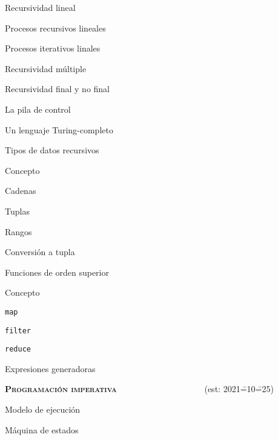 \begin{longenum}
\begin{longenum}
\begin{longenum}
\begin{longenum}
                \item Recursividad lineal
                \begin{longenum}
                    \item Procesos recursivos lineales
                    \item Procesos iterativos linales
                \end{longenum}
                \item Recursividad múltiple
                \item Recursividad final y no final
            \end{longenum}
            \item La pila de control
            \item Un lenguaje Turing-completo
        \end{longenum}
        \item Tipos de datos recursivos
        \begin{longenum}
            \item Concepto
            \item Cadenas
            \item Tuplas
            \item Rangos
            \item Conversión a tupla
        \end{longenum}
        \item Funciones de orden superior
        \begin{longenum}
            \item Concepto
            \item \texttt{map}
            \item \texttt{filter}
            \item \texttt{reduce}
            \item Expresiones generadoras
        \end{longenum}
    \end{longenum}
    \item \textbf{\textsc{Programación imperativa}} \ \ \ \ \ \ \ \ \ \ \ \ \ \ \ \ \ \ \ \ (est: 2021\==10\==25)
    \begin{longenum}
        \item Modelo de ejecución
        \begin{longenum}
            \item Máquina de estados

\end{longenum}
\end{longenum}
\end{longenum}
